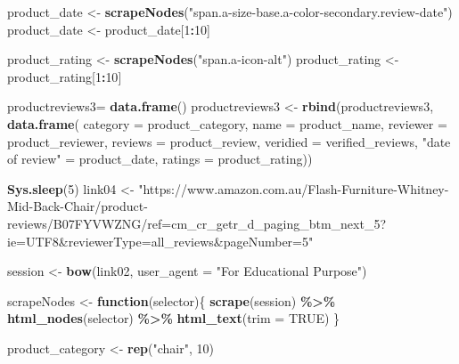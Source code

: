 \documentclass[
]{article}
\newenvironment{Shaded}{\begin{snugshade}}{\end{snugshade}}
\newcommand{\AttributeTok}[1]{\textcolor[rgb]{0.13,0.29,0.53}{#1}}
\newcommand{\ConstantTok}[1]{\textcolor[rgb]{0.56,0.35,0.01}{#1}}
\newcommand{\ControlFlowTok}[1]{\textcolor[rgb]{0.13,0.29,0.53}{\textbf{#1}}}
\newcommand{\DecValTok}[1]{\textcolor[rgb]{0.00,0.00,0.81}{#1}}
\newcommand{\FunctionTok}[1]{\textcolor[rgb]{0.13,0.29,0.53}{\textbf{#1}}}
\newcommand{\NormalTok}[1]{#1}
\newcommand{\OtherTok}[1]{\textcolor[rgb]{0.56,0.35,0.01}{#1}}
\newcommand{\SpecialCharTok}[1]{\textcolor[rgb]{0.81,0.36,0.00}{\textbf{#1}}}
\newcommand{\StringTok}[1]{\textcolor[rgb]{0.31,0.60,0.02}{#1}}
\begin{document}
\begin{Shaded}
\begin{Highlighting}[]
\NormalTok{  product\_date }\OtherTok{\textless{}{-}} \FunctionTok{scrapeNodes}\NormalTok{(}\StringTok{"span.a{-}size{-}base.a{-}color{-}secondary.review{-}date"}\NormalTok{)}
\NormalTok{  product\_date }\OtherTok{\textless{}{-}}\NormalTok{ product\_date[}\DecValTok{1}\SpecialCharTok{:}\DecValTok{10}\NormalTok{]}
  
\NormalTok{  product\_rating }\OtherTok{\textless{}{-}} \FunctionTok{scrapeNodes}\NormalTok{(}\StringTok{"span.a{-}icon{-}alt"}\NormalTok{)}
\NormalTok{  product\_rating }\OtherTok{\textless{}{-}}\NormalTok{ product\_rating[}\DecValTok{1}\SpecialCharTok{:}\DecValTok{10}\NormalTok{]}
  
\NormalTok{  productreviews3}\OtherTok{=} \FunctionTok{data.frame}\NormalTok{()}
\NormalTok{  productreviews3 }\OtherTok{\textless{}{-}} \FunctionTok{rbind}\NormalTok{(productreviews3, }\FunctionTok{data.frame}\NormalTok{(}
                      \AttributeTok{category =}\NormalTok{ product\_category,}
                      \AttributeTok{name =}\NormalTok{ product\_name,}
                      \AttributeTok{reviewer =}\NormalTok{ product\_reviewer,}
                      \AttributeTok{reviews =}\NormalTok{ product\_review,}
                      \AttributeTok{veridied =}\NormalTok{ verified\_reviews,}
                      \StringTok{"date of review"} \OtherTok{=}\NormalTok{ product\_date,}
                      \AttributeTok{ratings =}\NormalTok{ product\_rating))}
  
  
  \FunctionTok{Sys.sleep}\NormalTok{(}\DecValTok{5}\NormalTok{)}
\NormalTok{link04 }\OtherTok{\textless{}{-}} \StringTok{"https://www.amazon.com.au/Flash{-}Furniture{-}Whitney{-}Mid{-}Back{-}Chair/product{-}reviews/B07FYVWZNG/ref=cm\_cr\_getr\_d\_paging\_btm\_next\_5?ie=UTF8\&reviewerType=all\_reviews\&pageNumber=5"}


\NormalTok{  session }\OtherTok{\textless{}{-}} \FunctionTok{bow}\NormalTok{(link02,}
               \AttributeTok{user\_agent =} \StringTok{"For Educational Purpose"}\NormalTok{)}

\NormalTok{  scrapeNodes }\OtherTok{\textless{}{-}} \ControlFlowTok{function}\NormalTok{(selector)\{}
    \FunctionTok{scrape}\NormalTok{(session) }\SpecialCharTok{\%\textgreater{}\%}
      \FunctionTok{html\_nodes}\NormalTok{(selector) }\SpecialCharTok{\%\textgreater{}\%}
      \FunctionTok{html\_text}\NormalTok{(}\AttributeTok{trim =} \ConstantTok{TRUE}\NormalTok{)}
\NormalTok{  \}}

\NormalTok{  product\_category }\OtherTok{\textless{}{-}} \FunctionTok{rep}\NormalTok{(}\StringTok{"chair"}\NormalTok{, }\DecValTok{10}\NormalTok{)}


\end{Highlighting}
\end{Shaded}
\end{document}
